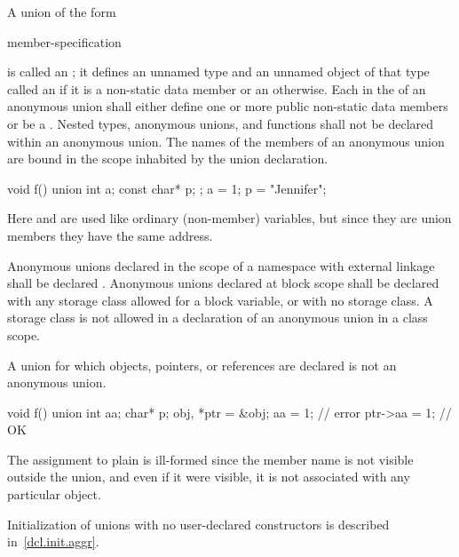 \pnum
{}%
%
A union of the form
\begin{ncsimplebnf}
 \terminal{\{} member-specification \terminal{\}} \terminal{;}
\end{ncsimplebnf}
is called an ; it defines an unnamed type and
an unnamed object of that type called
an 
if it is a non-static data member or
an  otherwise.
%
%
Each  in the 
of an anonymous union shall either define one or more public non-static data members or
be a .
Nested types, anonymous unions, and functions
shall not be declared within an anonymous union.
The names of the members of an anonymous union
are bound in the scope inhabited by the union declaration.
\begin{example}
\begin{codeblock}
void f() {
  union { int a; const char* p; };
  a = 1;
  p = "Jennifer";
}
\end{codeblock}

Here  and  are used like ordinary (non-member)
variables, but since they are union members they have the same address.
\end{example}

\pnum
{}%
%
Anonymous unions declared in the scope of a namespace with external linkage
shall be declared . Anonymous unions declared at
block scope shall be declared with any storage class allowed for a
block variable, or with no storage class. A storage class is not
allowed in a declaration of an anonymous union in a class scope.

\pnum
\begin{note}
A union for which objects, pointers, or references are declared is not an anonymous union.
\begin{example}
\begin{codeblock}
void f() {
  union { int aa; char* p; } obj, *ptr = &obj;
  aa = 1;           // error
  ptr->aa = 1;      // OK
}
\end{codeblock}

The assignment to plain  is ill-formed since the member name
is not visible outside the union, and even if it were visible, it is not
associated with any particular object.
\end{example}
\end{note}
\begin{note}
Initialization of unions with no user-declared constructors is described
in~\ref{dcl.init.aggr}.
\end{note}

